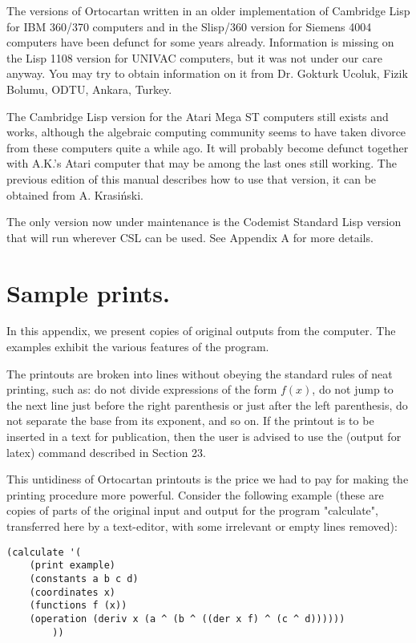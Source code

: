 The versions of Ortocartan  written  in  an  older  implementation of Cambridge
Lisp for IBM 360/370 computers and in the Slisp/360 version  for  Siemens  4004
computers have been defunct for some years already. Information is missing on
the Lisp 1108 version for UNIVAC computers, but it was not under  our
     care anyway. You may try to obtain information  on  it  from
     Dr. Gokturk Ucoluk, Fizik Bolumu, ODTU, Ankara, Turkey.

The Cambridge Lisp version for the Atari Mega ST computers still exists and
works, although the algebraic computing community seems to have taken divorce
from these computers quite a while ago. It will probably become defunct
together with A.K.'s Atari computer that may be among the last ones still
working. The previous edition of this manual describes how to use that version,
it can be obtained from A. Krasi\'nski.

The only version now under maintenance is the Codemist Standard Lisp version
that will run wherever CSL can be used. See Appendix A for more details.

\section{Sample prints.}

In this appendix, we present copies of original  outputs
     from the computer. The examples exhibit the various features
     of the program.

The printouts are broken into lines without obeying the standard  rules  of
neat printing, such as: do not divide expressions of the form $f(x)$, do not
jump to the  next  line
     just  before  the  right  parenthesis or just after the left
     parenthesis, do not separate the base from its exponent, and
so on. If the printout is to be inserted in a text for  publication, then the
user is advised to use the (output for latex) command described in Section 23.

This untidiness of Ortocartan printouts is the price we had to pay  for  making
     the printing procedure more powerful. Consider the following
example (these are copies of parts of the  original  input and output for  the
program "calculate", transferred here by a text-editor, with some irrelevant or
empty lines removed):

\bigskip

\begin{verbatim}
(calculate '(
    (print example)
    (constants a b c d)
    (coordinates x)
    (functions f (x))
    (operation (deriv x (a ^ (b ^ ((der x f) ^ (c ^ d))))))
        ))
\end{verbatim}

